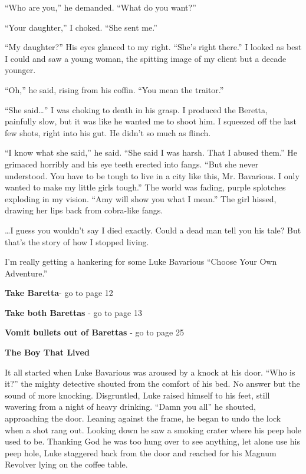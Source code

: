 ``Who are you,'' he demanded. ``What do you
want?''



``Your daughter,'' I choked. ``She sent
me.''



``My daughter?'' His eyes glanced to my right.
``She's right there.'' I looked as best I could and
saw a young woman, the spitting image of my client but a decade
younger.



``Oh,'' he said, rising from his coffin. ``You mean
the traitor.''



``She said{\ldots}'' I was choking to death in his grasp.
I produced the Beretta, painfully slow, but it was like he wanted
me to shoot him. I squeezed off the last few shots, right into his
gut. He didn't so much as flinch.



``I know what she said,'' he said. ``She said I was
harsh. That I abused them.'' He grimaced horribly and his eye
teeth erected into fangs. ``But she never understood. You have
to be tough to live in a city like this, Mr. Bavarious. I only
wanted to make my little girls tough.'' The world was fading,
purple splotches exploding in my vision. ``Amy will show you
what I mean.'' The girl hissed, drawing her lips back from
cobra-like fangs.



{\ldots}I guess you wouldn't say I died exactly. Could a dead
man tell you his tale? But that's the story of how I stopped
living. 
 





I'm really getting a hankering for some Luke Bavarious ``Choose Your
Own Adventure.''



{\bf Take Baretta}- go to page 12

{\bf Take both Barettas} - go to page 13

{\bf Vomit bullets out of Barettas} - go to page 25 

 





{\bf The Boy That Lived}



It all started when Luke Bavarious was aroused by a knock at his
door. ``Who is it?'' the mighty detective shouted from the comfort of
his bed. No answer but the sound of more knocking. Disgruntled,
Luke raised himself to his feet, still wavering from a night of
heavy drinking. ``Damn you all'' he shouted, approaching the door.
Leaning against the frame, he began to undo the lock when a shot
rang out. Looking down he saw a smoking crater where his peep hole
used to be. Thanking God he was too hung over to see anything, let
alone use his peep hole, Luke staggered back from the door and
reached for his Magnum Revolver lying on the coffee table.




